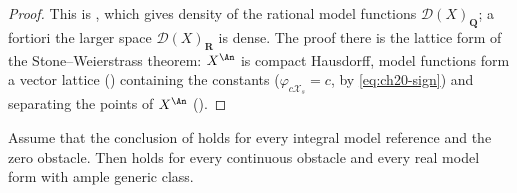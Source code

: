 \begin{proof}
This is , which gives density of
the rational model functions \(\mathcal D(X)_{\mathbf Q}\); a fortiori the
larger space \(\mathcal D(X)_{\mathbf R}\) is dense.  The proof there is the
lattice form of the Stone--Weierstrass theorem: \(X^{\An}\) is compact
Hausdorff, model functions form a vector lattice
() containing the constants
(\(\varphi_{c\mathcal X_s}=c\), by \eqref{eq:ch20-sign}) and separating the
points of \(X^{\An}\) ().
\end{proof}

\begin{lemma}\label{lem:ch23-reduction-to-base-ideals}
Assume that the conclusion of
 holds for every integral model
reference and the zero obstacle.  Then
 holds for every continuous obstacle and
every real model form with ample generic class.
\end{lemma}

